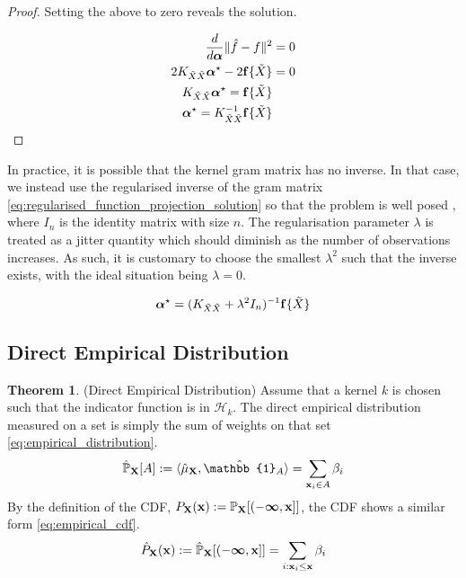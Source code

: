 \documentclass[twoside]{article} \usepackage{aistats2017}
\theoremstyle{definition}
\theoremstyle{theorem}
\newtheorem{theorem}{Theorem}[section]
\newcommand{\rv}[1]{{#1}}
\newcommand{\ds}[1]{\tilde{#1}}
\newcommand{\inner}[2]{{\langle #1, #2 \rangle}}
\begin{document}
\begin{proof}
			Setting the above to zero reveals the solution.
			
			\begin{align*}
				\frac{d}{d \bm{\alpha}} \Vert \hat{f} - f \Vert^{2} &= 0 \\
				2 K_{\ds{X} \ds{X}}  \bm{\alpha}^{\star} - 2 \bvec{f}\{\ds{X}\} &= 0 \\
				K_{\ds{X} \ds{X}}  \bm{\alpha}^{\star} = \bvec{f}\{\ds{X}\} \\
				\bm{\alpha}^{\star} = K_{\ds{X} \ds{X}}^{-1} \bvec{f}\{\ds{X}\}
			\end{align*}
		\end{proof}
		
		In practice, it is possible that the kernel gram matrix has no inverse. In that case, we instead use the regularised inverse of the gram matrix \eqref{eq:regularised_function_projection_solution} so that the problem is well posed \citep{muandet2016kernel}, where $I_{n}$ is the identity matrix with size $n$. The regularisation parameter $\lambda$ is treated as a jitter quantity which should diminish as the number of observations increases. As such, it is customary to choose the smallest $\lambda^{2}$ such that the inverse exists, with the ideal situation being $\lambda = 0$. 
		
		\begin{equation}
			\bm{\alpha}^{\star} = (K_{\ds{X} \ds{X}} + \lambda^{2} I_{n})^{-1} \bvec{f}\{\ds{X}\}
		\label{eq:regularised_function_projection_solution}
		\end{equation}

	\subsection{Direct Empirical Distribution}
	\label{sec:direct_quantile_regression:direct_empirical_distribution}

		\begin{theorem} \label{thm:empirical_distribution_and_cdf}
			(Direct Empirical Distribution)
			Assume that a kernel $k$ is chosen such that the indicator function is in $\mathcal{H}_{k}$. The direct empirical distribution measured on a set is simply the sum of weights on that set \eqref{eq:empirical_distribution}.
			\begin{equation}
				\hat{\mathbb{P}}_{\bvec{\rv{X}}}[A] := \inner{\hat{\mu}_{\bvec{\rv{X}}}}{ \hat{\mathbb{1}}_{A}} = \sum_{\bvec{x}_{i} \in A} \beta_{i}
			\label{eq:empirical_distribution}
			\end{equation}
			By the definition of the CDF, $P_{\bvec{\rv{X}}}(\bvec{x}) := \mathbb{P}_{\bvec{\rv{X}}}[(-\bm{\infty}, \bvec{x}]]$, the CDF shows a similar form \eqref{eq:empirical_cdf}.
			\begin{equation}
				\hat{P}_{\bvec{\rv{X}}}(\bvec{x}) := \hat{\mathbb{P}}_{\bvec{\rv{X}}}[(-\bm{\infty}, \bvec{x}]] = \sum_{i : \bvec{x}_{i} \leq \bvec{x}} \beta_{i}
			\label{eq:empirical_cdf}
			\end{equation}
		\end{theorem}
			
\end{document}
